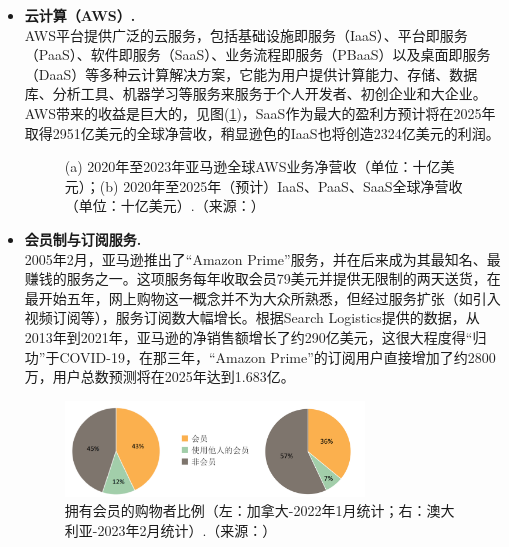 \documentclass[12pt]{ctexart}
\begin{document}
\begin{itemize}
    
    \item \textbf{云计算（AWS）.} \\
    AWS平台提供广泛的云服务，包括基础设施即服务（IaaS）、平台即服务（PaaS）、软件即服务（SaaS）、业务流程即服务（PBaaS）以及桌面即服务（DaaS）等多种云计算解决方案，它能为用户提供计算能力、存储、数据库、分析工具、机器学习等服务来服务于个人开发者、初创企业和大企业。AWS带来的收益是巨大的，见图(\ref{fig:two_images})，SaaS作为最大的盈利方预计将在2025年取得2951亿美元的全球净营收，稍显逊色的IaaS也将创造2324亿美元的利润。
    \begin{figure}[htbp!]
        \centering
        \caption{(a) 2020年至2023年亚马逊全球AWS业务净营收（单位：十亿美元）；(b) 2020年至2025年（预计）IaaS、PaaS、SaaS全球净营收（单位：十亿美元）.（来源：\cite{20}）}
        \label{fig:two_images}
    \end{figure}
    
    
    \item \textbf{会员制与订阅服务.} \\
    2005年2月，亚马逊推出了“Amazon Prime”服务，并在后来成为其最知名、最赚钱的服务之一。这项服务每年收取会员79美元并提供无限制的两天送货，在最开始五年，网上购物这一概念并不为大众所熟悉，但经过服务扩张（如引入视频订阅等），服务订阅数大幅增长。根据Search Logistics提供的数据，从2013年到2021年，亚马逊的净销售额增长了约290亿美元，这很大程度得“归功”于COVID-19，在那三年，“Amazon Prime”的订阅用户直接增加了约2800万，用户总数预测将在2025年达到1.683亿\cite{13}。

    \begin{figure}[htbp!]
        \centering
        \includegraphics[width=0.75\textwidth]{Images/6.png}
        \caption{拥有会员的购物者比例（左：加拿大-2022年1月统计；右：澳大利亚-2023年2月统计）.（来源：\cite{16}）}
        \label{perc}
    \end{figure}


\end{itemize}
\end{document}
